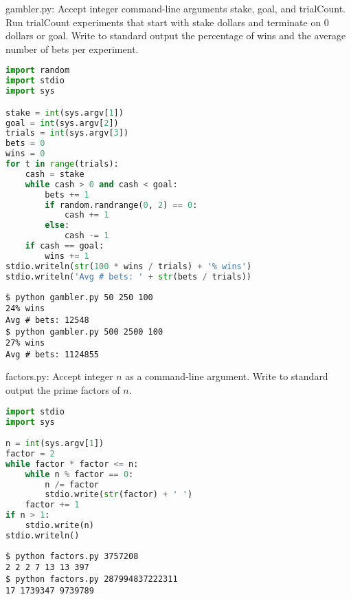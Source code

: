 \documentclass[8pt,a4paper,compress,handout]{beamer}
\begin{document}
\begin{frame}[fragile]
\begin{framed}
\tiny gambler.py: Accept integer command-line arguments stake, goal, and trialCount. Run trialCount experiments that start with stake dollars and terminate on 0 dollars or goal. Write to standard output the percentage of wins and the average number of bets per experiment.
\end{framed}

\begin{lstlisting}[language=Python]
import random
import stdio
import sys

stake = int(sys.argv[1])
goal = int(sys.argv[2])
trials = int(sys.argv[3])
bets = 0
wins = 0
for t in range(trials):
    cash = stake
    while cash > 0 and cash < goal:
        bets += 1
        if random.randrange(0, 2) == 0:
            cash += 1
        else:
            cash -= 1
    if cash == goal:
        wins += 1
stdio.writeln(str(100 * wins / trials) + '% wins')
stdio.writeln('Avg # bets: ' + str(bets / trials))
\end{lstlisting}

\begin{lstlisting}[language={}]
$ python gambler.py 50 250 100
24% wins
Avg # bets: 12548
$ python gambler.py 500 2500 100
27% wins
Avg # bets: 1124855
\end{lstlisting}
\end{frame}

\begin{frame}[fragile]
\begin{framed}
\tiny factors.py: Accept integer $n$ as a command-line argument. Write to standard output the prime factors of $n$.
\end{framed}

\begin{lstlisting}[language=Python]
import stdio
import sys

n = int(sys.argv[1])
factor = 2
while factor * factor <= n:
    while n % factor == 0:
        n /= factor
        stdio.write(str(factor) + ' ')
    factor += 1
if n > 1:
    stdio.write(n)
stdio.writeln()
\end{lstlisting}

\begin{lstlisting}[language={}]
$ python factors.py 3757208
2 2 2 7 13 13 397
$ python factors.py 287994837222311
17 1739347 9739789
\end{lstlisting}
\end{frame}
\end{document}
